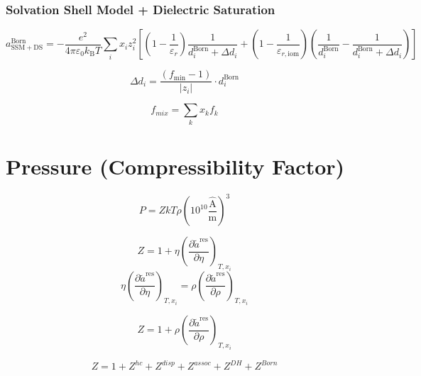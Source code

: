 \documentclass[12pt, letterpaper]{article}
\begin{document}
\subsubsection{Solvation Shell Model + Dielectric Saturation}

\cite{Figiel2025}

\begin{equation}
a_{\mathrm{SSM+DS}}^{\mathrm{Born}}=-\frac{e^{2}}{4\pi\varepsilon_{0}k_{\mathrm{B}}T}\sum_{i}x_{i}z_{i}^{2}\left[\left(1-\frac{1}{\varepsilon_{r}}\right)\frac{1}{d_{i}^{\mathrm{Born}}+\Delta d_{i}}+\left(1-\frac{1}{\varepsilon_{r,\mathrm{iom}}}\right)\left(\frac{1}{d_{i}^{\mathrm{Born}}}-\frac{1}{d_{i}^{\mathrm{Born}}+\Delta d_{i}}\right)\right]
\end{equation}

\begin{equation}
\Delta d_i=\frac{(f_{\min}-1)}{|z_i|}\cdot d_i^{\mathrm{Born}}
\end{equation}

\begin{equation}
f_{mix}=\sum_{k}x_{k}f_{k}
\end{equation}

\section{Pressure (Compressibility Factor)}

\cite{Gross2001}

\begin{equation}
P=ZkT\rho\left(10^{10}\frac{\hat{\mathrm{A}}}{\mathrm{m}}\right)^{3}
\end{equation}

\begin{equation}
Z=1+\eta\left(\frac{\partial\tilde{a}^\mathrm{res}}{\partial\eta}\right)_{T,x_i}
\end{equation}
\begin{equation}
\eta\left(\frac{\partial\tilde{a}^\mathrm{res}}{\partial\eta}\right)_{T,x_i} = \rho\left(\frac{\partial\tilde{a}^\mathrm{res}}{\partial\rho}\right)_{T,x_i}
\end{equation}

\begin{equation}
Z=1+\rho\left(\frac{\partial\tilde{a}^\mathrm{res}}{\partial\rho}\right)_{T,x_i}
\end{equation}

\begin{equation}
    Z = 1 + Z^{hc} + Z^{disp} + Z^{assoc} + Z^{DH} + Z^{Born}
\end{equation}
\end{document}
